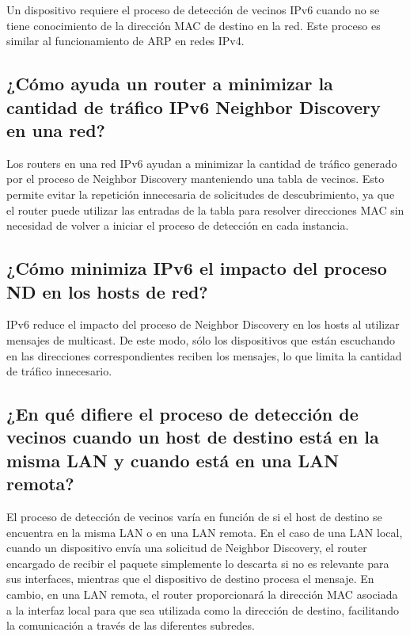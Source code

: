 \documentclass[a4paper,12pt]{article}
\begin{document}
Un dispositivo requiere el proceso de detección de vecinos IPv6 cuando no se tiene conocimiento de la dirección MAC de destino en la red. Este proceso es similar al funcionamiento de ARP en redes IPv4.\\

\subsection{¿Cómo ayuda un router a minimizar la cantidad de tráfico IPv6 Neighbor Discovery en una red? }

Los routers en una red IPv6 ayudan a minimizar la cantidad de tráfico generado por el proceso de Neighbor Discovery manteniendo una tabla de vecinos. Esto permite evitar la repetición innecesaria de solicitudes de descubrimiento, ya que el router puede utilizar las entradas de la tabla para resolver direcciones MAC sin necesidad de volver a iniciar el proceso de detección en cada instancia.\\

\subsection{¿Cómo minimiza IPv6 el impacto del proceso ND en los hosts de red? }

IPv6 reduce el impacto del proceso de Neighbor Discovery en los hosts al utilizar mensajes de multicast. De este modo, sólo los dispositivos que están escuchando en las direcciones correspondientes reciben los mensajes, lo que limita la cantidad de tráfico innecesario.\\

\subsection{¿En qué difiere el proceso de detección de vecinos cuando un host de destino está en la misma LAN y cuando está en una LAN remota? }

El proceso de detección de vecinos varía en función de si el host de destino se encuentra en la misma LAN o en una LAN remota. En el caso de una LAN local, cuando un dispositivo envía una solicitud de Neighbor Discovery, el router encargado de recibir el paquete simplemente lo descarta si no es relevante para sus interfaces, mientras que el dispositivo de destino procesa el mensaje. 
En cambio, en una LAN remota, el router proporcionará la dirección MAC asociada a la interfaz local para que sea utilizada como la dirección de destino, facilitando la comunicación a través de las diferentes subredes.\\
\end{document}

